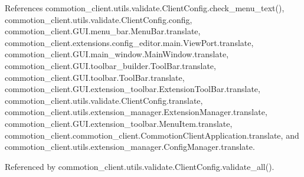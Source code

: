 References commotion\+\_\+client.\+utils.\+validate.\+Client\+Config.\+check\+\_\+menu\+\_\+text(), commotion\+\_\+client.\+utils.\+validate.\+Client\+Config.\+config, commotion\+\_\+client.\+G\+U\+I.\+menu\+\_\+bar.\+Menu\+Bar.\+translate, commotion\+\_\+client.\+extensions.\+config\+\_\+editor.\+main.\+View\+Port.\+translate, commotion\+\_\+client.\+G\+U\+I.\+main\+\_\+window.\+Main\+Window.\+translate, commotion\+\_\+client.\+G\+U\+I.\+toolbar\+\_\+builder.\+Tool\+Bar.\+translate, commotion\+\_\+client.\+G\+U\+I.\+toolbar.\+Tool\+Bar.\+translate, commotion\+\_\+client.\+G\+U\+I.\+extension\+\_\+toolbar.\+Extension\+Tool\+Bar.\+translate, commotion\+\_\+client.\+utils.\+validate.\+Client\+Config.\+translate, commotion\+\_\+client.\+utils.\+extension\+\_\+manager.\+Extension\+Manager.\+translate, commotion\+\_\+client.\+G\+U\+I.\+extension\+\_\+toolbar.\+Menu\+Item.\+translate, commotion\+\_\+client.\+commotion\+\_\+client.\+Commotion\+Client\+Application.\+translate, and commotion\+\_\+client.\+utils.\+extension\+\_\+manager.\+Config\+Manager.\+translate.



Referenced by commotion\+\_\+client.\+utils.\+validate.\+Client\+Config.\+validate\+\_\+all().



